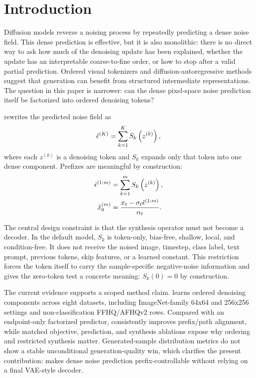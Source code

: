\section{Introduction}

Diffusion models reverse a noising process by repeatedly predicting a dense
noise field. This dense prediction is effective, but it is also monolithic:
there is no direct way to ask how much of the denoising update has been
explained, whether the update has an interpretable coarse-to-fine order, or how
to stop after a valid partial prediction. Ordered visual tokenizers and
diffusion-autoregressive methods suggest that generation can benefit from
structured intermediate representations. The question in this paper is
narrower: can the dense pixel-space noise prediction itself be factorized into
ordered denoising tokens?

\method{} rewrites the predicted noise field as
\begin{equation}
  \hat{\epsilon}^{(K)} = \sum_{k=1}^{K} S_k\left(z^{(k)}\right),
  \label{eq:full-factorization}
\end{equation}
where each $z^{(k)}$ is a denoising token and $S_k$ expands only
that token into one dense component. Prefixes are meaningful by construction:
\begin{align}
  \hat{\epsilon}^{(1:m)} &= \sum_{k=1}^{m} S_k\left(z^{(k)}\right), \\
  \hat{x}^{(m)}_0 &= \frac{x_t - \sigma_t \hat{\epsilon}^{(1:m)}}{\alpha_t}.
  \label{eq:prefix-denoise}
\end{align}

The central design constraint is that the synthesis operator must not become a
decoder. In the default \method{} model, $S_k$ is token-only, bias-free,
shallow, local, and condition-free. It does not receive the noised image,
timestep, class label, text prompt, previous tokens, skip features, or a learned
constant. This restriction forces the token itself to carry the sample-specific
negative-noise information and gives the zero-token test a concrete meaning:
$S_k(0)=0$ by construction.

The current evidence supports a scoped method claim. \method{} learns ordered
denoising components across eight datasets, including ImageNet-family 64x64 and
256x256 settings and non-classification FFHQ/AFHQv2 rows. Compared with an
endpoint-only factorized predictor, \method{} consistently improves
  prefix/path alignment, while matched objective, prediction, and synthesis
  ablations expose why ordering and restricted synthesis matter. Generated-sample
distribution metrics do not show a stable unconditional generation-quality win,
which clarifies the present contribution: \method{} makes dense noise
prediction prefix-controllable without relying on a final VAE-style decoder.

